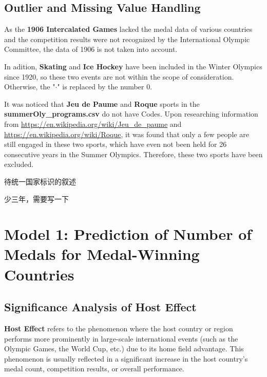 \documentclass{mcmthesis}
\begin{document}
\subsection{Outlier and Missing Value Handling}
As the \textbf{1906 Intercalated Games} lacked the medal data of various countries and the competition results were not recognized by the International Olympic Committee, the data of 1906 is not taken into account.

In adition, \textbf{Skating} and \textbf{Ice Hockey} have been included in the Winter Olympics since 1920, so these two events are not within the scope of consideration. Otherwise, the "$\cdot$" is replaced by the number $0$. 

It was noticed that \textbf{Jeu de Paume} and \textbf{Roque} sports in the {\bf summerOly\_programs.csv} do not have Codes. Upon researching information from {\color{blue}\url{https://en.wikipedia.org/wiki/Jeu_de_paume}} and {\color{blue}\url{https://en.wikipedia.org/wiki/Roque}}, it was found that only a few people are still engaged in these two sports, which have even not been held for 26 consecutive years in the Summer Olympics. Therefore, these two sports have been excluded.



待统一国家标识的叙述

少三年，需要写一下












\section{Model 1: Prediction of Number of Medals for Medal-Winning Countries}

\subsection{Significance Analysis of Host Effect}

\textbf{Host Effect} refers to the phenomenon where the host country or region performs more prominently in large-scale international events (such as the Olympic Games, the World Cup, etc.) due to its home field advantage. This phenomenon is usually reflected in a significant increase in the host country's medal count, competition results, or overall performance. 
\end{document}
